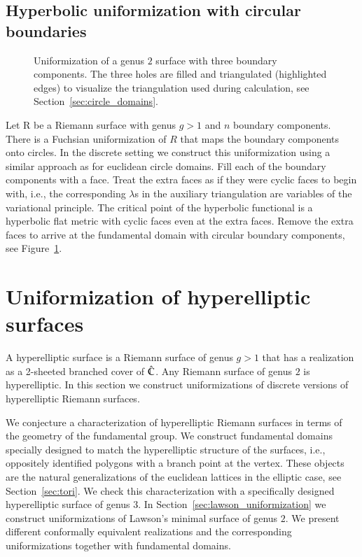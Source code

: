 \documentclass[Thesis]{subfiles}
\begin{document}
\subsection{Hyperbolic uniformization with circular boundaries}
\label{sec:hyperbolic_circle_domain}

\begin{figure}
\centering
{}
\caption{
Uniformization of a genus $2$ surface with three boundary components. 
The three holes are filled and triangulated (highlighted edges) to visualize the triangulation used during calculation, see Section~\ref{sec:circle_domains}.
}
\label{fig:hyperbolic_circle_domain}
\end{figure}

Let R be a Riemann surface with genus $g>1$ and $n$ boundary components.
There is a Fuchsian uniformization of $R$ that maps the boundary components onto circles.
In the discrete setting we construct this uniformization using a similar approach as for euclidean circle domains.
Fill each of the boundary components with a face.
Treat the extra faces as if they were cyclic faces to begin with, i.e., the corresponding $\lambda$s in the auxiliary triangulation are variables of the variational principle.
The critical point of the hyperbolic functional is a hyperbolic flat metric with cyclic faces even at the extra faces.
Remove the extra faces to arrive at the fundamental domain with circular boundary components, see Figure~\ref{fig:hyperbolic_circle_domain}.


\section{Uniformization of hyperelliptic surfaces}
\label{sec:hyperelliptic}

A hyperelliptic surface is a Riemann surface of genus $g>1$ that has a realization as a 2-sheeted branched cover of $\hat{\mathbb C}$.
Any Riemann surface of genus $2$ is hyperelliptic.
In this section we construct uniformizations of discrete versions of hyperelliptic Riemann surfaces.

We conjecture a characterization of hyperelliptic Riemann surfaces in terms of the geometry of the fundamental group. 
We construct fundamental domains specially designed to match the hyperelliptic structure of the surfaces, i.e., oppositely identified polygons with a branch point at the vertex.
These objects are the natural generalizations of the euclidean lattices in the elliptic case, see Section~\ref{sec:tori}.
We check this characterization with a specifically designed hyperelliptic surface of genus $3$.
In Section~\ref{sec:lawson_uniformization} we construct uniformizations of Lawson's minimal surface of genus $2$. We present different conformally equivalent realizations and the corresponding uniformizations together with fundamental domains.
\end{document}
